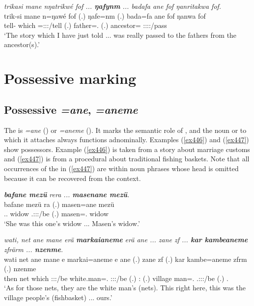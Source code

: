 \begin{exe}
	\ex \emph{trikasi mane nŋatrikwé fof ... \textbf{ŋafynm} ... badafa ane fof ŋanritakwa fof.}\\
	\gll trik-si mane n=ŋawé fof (.) ŋafe=nm (.) bada=fa ane fof ŋanwa fof\\
	tell-{\Nmlz} which \Immpst=\Fsg:\Sbj:\Nonpast:\Ipfv/tell {\Emph} (.) father=\Dat.{\Nsg} (.) ancestor={\Abl} {\Dem} {\Emph} \Stsg:\Obj:\Pst:\Ipfv:\Venit/pass {\Emph}\\
	\trans `The story which I have just told ... was really passed to the fathers from the ancestor(s).'
	\label{ex461}
\end{exe}

\section{Possessive marking}\label{possessivemarking}
	
\subsection{Possessive \emph{=ane}, \emph{=aneme}} \label{posscase}

The   is \emph{=ane} (\Sg) or \emph{=aneme} (\Nsg). It marks the semantic role of , and the noun or  to which it attaches always functions adnominally. Examples (\ref{ex446}) and (\ref{ex447}) show  possessors. Example (\ref{ex446}) is taken from a story about marriage customs and (\ref{ex447}) is from a procedural about traditional fishing baskets. Note that all occurrences of the   in (\ref{ex447}) are within noun phrases whose  head is omitted because it can be recovered from the context.

\begin{exe}
	\ex \emph{\textbf{bafane mezü} rera ... \textbf{masenane mezü}.}\\
	\gll bafane mezü ra (.) masen=ane mezü\\
	\Recog.\Poss.{\Sg} widow \Tsg.\F:\Sbj:\Pst:\Ipfv/be (.) masen=\Poss.{\Sg} widow\\
	\trans `She was this one's widow ... Masen's widow.'
	\label{ex446}
\end{exe}
\begin{exe}
	\ex \emph{wati, net ane mane erä \textbf{markaianeme} erä ane ... zane zf ... \textbf{kar kambeaneme} zfrärm ... \textbf{nzenme}.}\\
	\gll wati net ane mane e markai=aneme e ane (.) zane zf (.) kar kambe=aneme zfrm (.) nzenme\\
	then net {\Dem} which \Stpl:\Sbj:\Nonpast:\Ipfv/be {white.man=\Poss.\Nsg} \Stpl:\Sbj:\Nonpast:\Ipfv/be {\Dem} (.) \Dem:{\Prox} {\Imm} (.) village man=\Poss.{\Nsg} \Tsg.\F:\Sbj:\Pst:\Dur/be (.) \Fnsg.{\Poss}\\ 
	\trans `As for those nets, they are the white man's (nets). This right here, this was the village people's (fishbasket) ... ours.'
	\label{ex447}
\end{exe}

